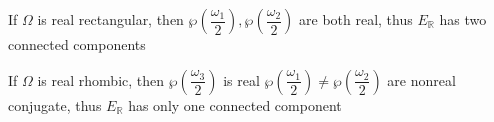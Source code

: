 \documentclass[12pt]{article}
\begin{document}
If $\Omega$ is real rectangular, then $\wp\left(\dfrac{\omega_1}{2}\right),\wp\left(\dfrac{\omega_2}{2}\right)$ are both real, thus $E_\mathbb{R}$ has two connected components \par
If $\Omega$ is real rhombic, then $\wp\left(\dfrac{\omega_3}{2}\right)$ is real $\wp\left(\dfrac{\omega_1}{2}\right)\neq\wp\left(\dfrac{\omega_2}{2}\right)$ are nonreal conjugate, thus $E_\mathbb{R}$ has only one connected component \par
\end{document}
